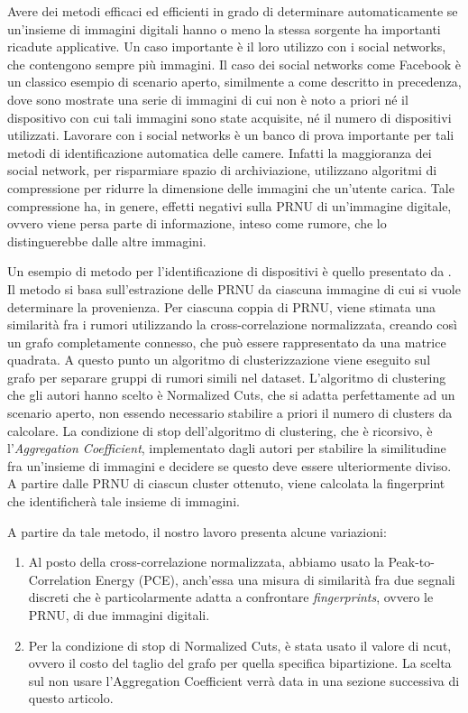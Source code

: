 Avere dei metodi efficaci ed efficienti in grado di determinare automaticamente se un'insieme di immagini digitali hanno o meno la stessa sorgente ha importanti ricadute applicative. Un caso importante è il loro utilizzo con i social networks, che contengono sempre più immagini. Il caso dei social networks come Facebook è un classico esempio di scenario aperto, similmente a come descritto in precedenza, dove sono mostrate una serie di immagini di cui non è noto a priori né il dispositivo con cui tali immagini sono state acquisite, né il numero di dispositivi utilizzati. Lavorare con i social networks è un banco di prova importante per tali metodi di identificazione automatica delle camere. Infatti la maggioranza dei social network, per risparmiare spazio di archiviazione, utilizzano algoritmi di compressione per ridurre la dimensione delle immagini che un'utente carica. Tale compressione ha, in genere, effetti negativi sulla PRNU di un'immagine digitale, ovvero viene persa parte di informazione, inteso come rumore, che lo distinguerebbe dalle altre immagini.

Un esempio di metodo per l'identificazione di dispositivi è quello presentato da \cite{Amerini2014831}. Il metodo si basa sull'estrazione delle PRNU da ciascuna immagine di cui si vuole determinare la provenienza. Per ciascuna coppia di PRNU, viene stimata una similarità fra i rumori utilizzando la cross-correlazione normalizzata, creando così un grafo completamente connesso, che può essere rappresentato da una matrice quadrata. A questo punto un algoritmo di clusterizzazione viene eseguito sul grafo per separare gruppi di rumori simili nel dataset. L'algoritmo di clustering che gli autori hanno scelto è Normalized Cuts, che si adatta perfettamente ad un scenario aperto, non essendo necessario stabilire a priori il numero di clusters da calcolare. La condizione di stop dell'algoritmo di clustering, che è ricorsivo, è l'\emph{Aggregation Coefficient}, implementato dagli autori per stabilire la similitudine fra un'insieme di immagini e decidere se questo deve essere ulteriormente diviso. A partire dalle PRNU di ciascun cluster ottenuto, viene calcolata la fingerprint che identificherà tale insieme di immagini.

A partire da tale metodo, il nostro lavoro presenta alcune variazioni:
\begin{enumerate}
\item Al posto della cross-correlazione normalizzata, abbiamo usato la Peak-to-Correlation Energy (PCE), anch'essa una misura di similarità fra due segnali discreti che è particolarmente adatta a confrontare \emph{fingerprints}, ovvero le PRNU, di due immagini digitali.
\item Per la condizione di stop di Normalized Cuts, è stata usato il valore di ncut, ovvero il costo del taglio del grafo per quella specifica bipartizione. La scelta sul non usare l'Aggregation Coefficient verrà data in una sezione successiva di questo articolo.
\end{enumerate}

